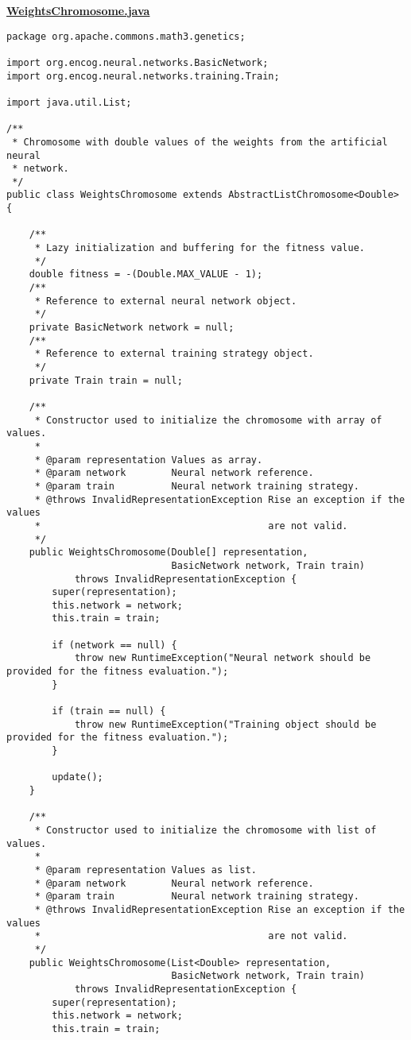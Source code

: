 \textbf{\underline{WeightsChromosome.java}}
\begin{verbatim}
package org.apache.commons.math3.genetics;

import org.encog.neural.networks.BasicNetwork;
import org.encog.neural.networks.training.Train;

import java.util.List;

/**
 * Chromosome with double values of the weights from the artificial neural
 * network.
 */
public class WeightsChromosome extends AbstractListChromosome<Double> {

    /**
     * Lazy initialization and buffering for the fitness value.
     */
    double fitness = -(Double.MAX_VALUE - 1);
    /**
     * Reference to external neural network object.
     */
    private BasicNetwork network = null;
    /**
     * Reference to external training strategy object.
     */
    private Train train = null;

    /**
     * Constructor used to initialize the chromosome with array of values.
     *
     * @param representation Values as array.
     * @param network        Neural network reference.
     * @param train          Neural network training strategy.
     * @throws InvalidRepresentationException Rise an exception if the values
     *                                        are not valid.
     */
    public WeightsChromosome(Double[] representation,
                             BasicNetwork network, Train train)
            throws InvalidRepresentationException {
        super(representation);
        this.network = network;
        this.train = train;

        if (network == null) {
            throw new RuntimeException("Neural network should be provided for the fitness evaluation.");
        }

        if (train == null) {
            throw new RuntimeException("Training object should be provided for the fitness evaluation.");
        }

        update();
    }

    /**
     * Constructor used to initialize the chromosome with list of values.
     *
     * @param representation Values as list.
     * @param network        Neural network reference.
     * @param train          Neural network training strategy.
     * @throws InvalidRepresentationException Rise an exception if the values
     *                                        are not valid.
     */
    public WeightsChromosome(List<Double> representation,
                             BasicNetwork network, Train train)
            throws InvalidRepresentationException {
        super(representation);
        this.network = network;
        this.train = train;


\end{verbatim}
